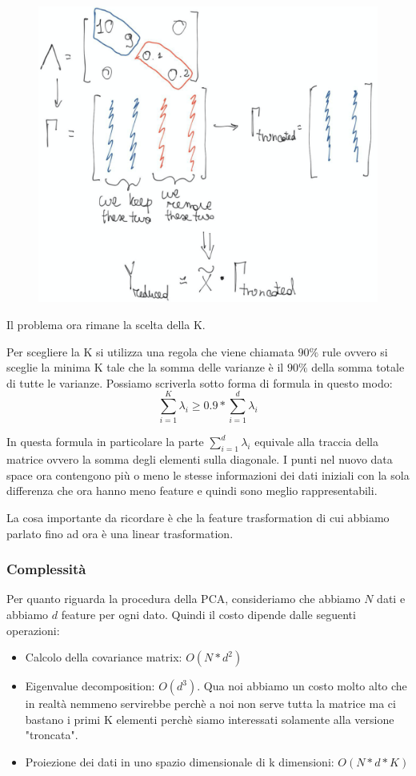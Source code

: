 \documentclass[14pt]{extreport}
\begin{document}
\begin{figure}[H]
	\centering
	\includegraphics[width=0.7\linewidth]{450.jpeg}
\end{figure}

Il problema ora rimane la scelta della K.

Per scegliere la K si utilizza una regola che viene chiamata $90\%$ rule ovvero si sceglie la minima K tale che la somma delle varianze è il $90\%$
della somma totale di tutte le varianze. Possiamo scriverla sotto forma di formula in questo modo:
$$\sum_{i=1}^K \lambda_i \geq 0.9 * \sum_{i=1}^d \lambda_i$$

In questa formula in particolare la parte $\sum_{i=1}^d \lambda_i$ equivale alla traccia della matrice ovvero la somma degli elementi sulla diagonale.
I punti nel nuovo data space ora contengono più o meno le stesse informazioni dei dati iniziali con la sola differenza che ora hanno meno feature e
quindi sono meglio rappresentabili.

La cosa importante da ricordare è che la feature trasformation di cui abbiamo parlato fino ad ora è una linear trasformation.

\subsubsection{Complessità}

Per quanto riguarda la procedura della PCA, consideriamo che abbiamo $N$ dati e abbiamo $d$ feature per ogni dato. Quindi il costo dipende dalle
seguenti operazioni:

\begin{itemize}
	\item Calcolo della covariance matrix: $O(N*d^2)$
	\item Eigenvalue decomposition: $O(d^3)$. Qua noi abbiamo un costo molto alto che in realtà nemmeno servirebbe perchè a noi non serve tutta la
	      matrice ma ci bastano i primi K elementi perchè siamo interessati solamente alla versione "troncata".
	\item Proiezione dei dati in uno spazio dimensionale di k dimensioni: $O(N*d*K)$
\end{itemize}
\end{document}
